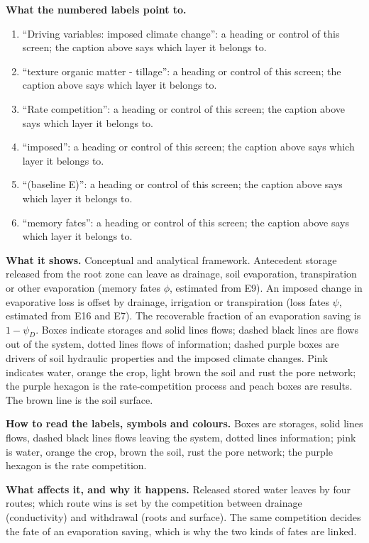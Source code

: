 \textbf{What the numbered labels point to.}
\begin{enumerate}[nosep,label=\protect\circled{\arabic*}]
\item ``Driving variables: imposed climate change'': a heading or control of this screen; the caption above says which layer it belongs to.
\item ``texture organic matter - tillage'': a heading or control of this screen; the caption above says which layer it belongs to.
\item ``Rate competition'': a heading or control of this screen; the caption above says which layer it belongs to.
\item ``imposed'': a heading or control of this screen; the caption above says which layer it belongs to.
\item ``(baseline E)'': a heading or control of this screen; the caption above says which layer it belongs to.
\item ``memory fates'': a heading or control of this screen; the caption above says which layer it belongs to.
\end{enumerate}

\textbf{What it shows.} Conceptual and analytical framework. Antecedent storage released from the root zone can leave as drainage, soil evaporation, transpiration or other evaporation (memory fates $\phi$, estimated from E9). An imposed change in evaporative loss is offset by drainage, irrigation or transpiration (loss fates $\psi$, estimated from E16 and E7). The recoverable fraction of an evaporation saving is $1-\psi_D$. Boxes indicate storages and solid lines flows; dashed black lines are flows out of the system, dotted lines flows of information; dashed purple boxes are drivers of soil hydraulic properties and the imposed climate changes. Pink indicates water, orange the crop, light brown the soil and rust the pore network; the purple hexagon is the rate-competition process and peach boxes are results. The brown line is the soil surface.

\textbf{How to read the labels, symbols and colours.} Boxes are storages, solid lines flows, dashed black lines flows leaving the system, dotted lines information; pink is water, orange the crop, brown the soil, rust the pore network; the purple hexagon is the rate competition.

\textbf{What affects it, and why it happens.} Released stored water leaves by four routes; which route wins is set by the competition between drainage (conductivity) and withdrawal (roots and surface). The same competition decides the fate of an evaporation saving, which is why the two kinds of fates are linked.

